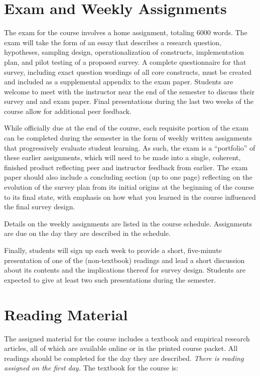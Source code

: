 \documentclass[11pt,a4paper]{article}
\begin{document}
\section{Exam and Weekly Assignments}
The exam for the course involves a home assignment, totaling 6000 words. The exam will take the form of an essay that describes a research question, hypotheses, sampling design, operationalization of constructs, implementation plan, and pilot testing of a proposed survey. A complete questionnaire for that survey, including exact question wordings of all core constructs, must be created and included as a supplemental appendix to the exam paper. Students are welcome to meet with the instructor near the end of the semester to discuss their survey and and exam paper. Final presentations during the last two weeks of the course allow for additional peer feedback.

While officially due at the end of the course, each requisite portion of the exam can be completed during the semester in the form of weekly written assignments that progressively evaluate student learning. As such, the exam is a ``portfolio'' of these earlier assignments, which will need to be made into a single, coherent, finished product reflecting peer and instructor feedback from earlier. The exam paper should also include a concluding section (up to one page) reflecting on the evolution of the survey plan from its initial origins at the beginning of the course to its final state, with emphasis on how what you learned in the course influenced the final survey design.

Details on the weekly assignments are listed in the course schedule. Assignments are due on the day they are described in the schedule.

Finally, students will sign up each week to provide a short, five-minute presentation of one of the (non-textbook) readings and lead a short discussion about its contents and the implications thereof for survey design. Students are expected to give at least two such presentations during the semester.


\section{Reading Material}
The assigned material for the course includes a textbook and empirical research articles, all of which are available online or in the printed course packet. All readings should be completed for the day they are described. {\em There is reading assigned on the first day.} The textbook for the course is:\\
\end{document}
